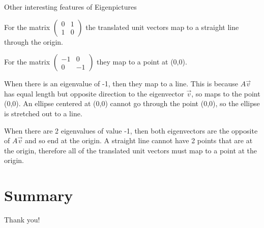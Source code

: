 \documentclass[notes]{beamer}
\begin{document}
\begin{frame}{Other interesting features of Eigenpictures}
{For the matrix $\begin{pmatrix}
        0 & 1 \\
        1 & 0
        \end{pmatrix}$ the translated unit vectors map to a straight line through the origin. 
        
For the matrix $\begin{pmatrix}
        -1 & 0 \\
        0 & -1 
        \end{pmatrix}$ they map to a point at (0,0).


When there is an eigenvalue of -1, then they map to a line. This is because $A\vec{v}$ has equal length but opposite direction to the eigenvector $\vec{v}$, so maps to the point (0,0). An ellipse centered at (0,0) cannot go through the point (0,0), so the ellipse is stretched out to a line.

When there are 2 eigenvalues of value -1, then both eigenvectors are the opposite of $A\vec{v} $ and so end at the origin. A straight line cannot have 2 points that are at the origin, therefore all of the translated unit vectors must map to a point at the origin.
}
\end{frame}



\section{Summary}
\begin{frame}
    \begin{center}
  \Huge  Thank you!
    \end{center}
    
    
\end{frame}
\end{document}

